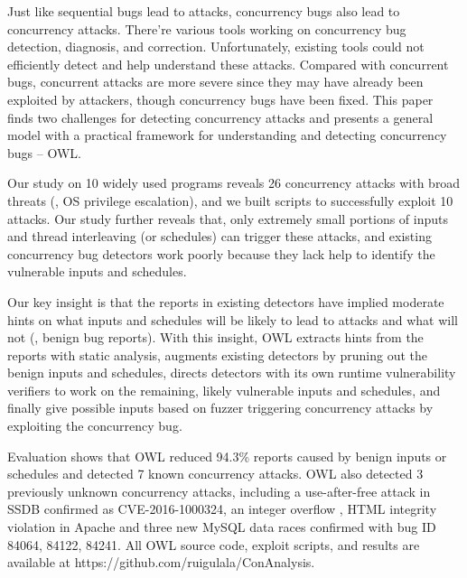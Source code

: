 Just like sequential bugs lead to attacks, concurrency bugs also lead to concurrency attacks. There're various tools working on concurrency bug detection, diagnosis, and correction. Unfortunately, existing tools could not efficiently detect and help 
understand these attacks. Compared with concurrent bugs, concurrent attacks are more severe since they may have already been exploited by attackers, though concurrency bugs have been fixed. 
This paper finds two challenges for detecting concurrency attacks and presents a general model with a practical framework for understanding and detecting concurrency bugs -- OWL.

Our study on 10 widely used programs reveals 26 concurrency attacks
with broad threats (\eg, OS privilege escalation), and we built
scripts to successfully exploit 10 attacks. Our study further reveals
that, only extremely small portions of inputs and thread
interleaving (or schedules) can trigger these attacks, and existing
concurrency bug detectors work poorly because they
lack help to identify the vulnerable inputs and schedules.

Our key insight is that the reports in existing detectors have
implied moderate hints on what inputs and schedules will be likely to lead to attacks and what will not (\eg, benign bug reports).
With this insight, OWL extracts hints from the reports with static analysis, augments existing detectors by pruning out the benign inputs
and schedules, directs detectors with its own runtime
vulnerability verifiers to work on the remaining, likely
vulnerable inputs and schedules, and finally give possible inputs based on fuzzer triggering concurrency attacks by exploiting the concurrency bug.

Evaluation shows that OWL reduced 94.3\% reports caused
by benign inputs or schedules and detected 7 known concurrency
attacks. OWL also detected 3 previously unknown
concurrency attacks, including a use-after-free attack in SSDB
confirmed as CVE-2016-1000324, an integer overflow ,
HTML integrity violation in Apache and three new MySQL
data races confirmed with bug ID 84064, 84122, 84241. All
OWL source code, exploit scripts, and results are available at
https://github.com/ruigulala/ConAnalysis.